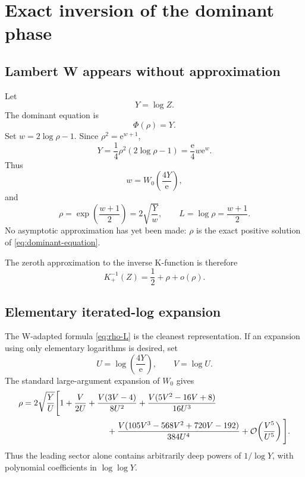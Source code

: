 \documentclass[11pt,a4paper]{article}
\numberwithin{equation}{section}
\theoremstyle{remark}
\newcommand{\e}{\mathrm e}
\newcommand{\Kinv}{K_{+}^{-1}}
\newcommand{\bigO}{\mathcal O}
\newcommand{\smallo}{o}
\begin{document}
\section{Exact inversion of the dominant phase}
\label{sec:dominant-inversion}

\subsection{Lambert W appears without approximation}

Let
\begin{equation}
Y=\log Z.
\label{eq:Y}
\end{equation}
The dominant equation is
\begin{equation}
\Phi(\rho)=Y.
\label{eq:dominant-equation}
\end{equation}
Set \(w=2\log\rho-1\).  Since \(\rho^2=\e^{w+1}\),
\[
Y=\frac14\rho^2(2\log\rho-1)
=\frac{\e}{4}w\e^w.
\]
Thus
\begin{equation}
w=W_0\!\left(\frac{4Y}{\e}\right),
\label{eq:w}
\end{equation}
and
\begin{equation}
\rho=\exp\!\left(\frac{w+1}{2}\right)
=2\sqrt{\frac{Y}{w}},
\qquad
L=\log\rho=\frac{w+1}{2}.
\label{eq:rho-L}
\end{equation}
No asymptotic approximation has yet been made: \(\rho\) is the exact positive
solution of \cref{eq:dominant-equation}.

The zeroth approximation to the inverse K-function is therefore
\begin{equation}
\Kinv(Z)=\frac12+\rho+\smallo(\rho).
\label{eq:leading-inverse}
\end{equation}

\subsection{Elementary iterated-log expansion}

The W-adapted formula \cref{eq:rho-L} is the cleanest representation.  If an
expansion using only elementary logarithms is desired, set
\begin{equation}
U=\log\!\left(\frac{4Y}{\e}\right),
\qquad V=\log U.
\label{eq:U-V}
\end{equation}
The standard large-argument expansion of \(W_0\) \cite{Corless1996,DLMFW}
gives
\begin{align}
\rho
={}&2\sqrt{\frac{Y}{U}}\Bigg[
1+\frac{V}{2U}
+\frac{V(3V-4)}{8U^2}
+\frac{V(5V^2-16V+8)}{16U^3}
\notag\\
&\hspace{31mm}
+\frac{V(105V^3-568V^2+720V-192)}{384U^4}
+\bigO\!\left(\frac{V^5}{U^5}\right)
\Bigg].
\label{eq:rho-elementary}
\end{align}
Thus the leading sector alone contains arbitrarily deep powers of
\(1/\log Y\), with polynomial coefficients in \(\log\log Y\).
\end{document}
